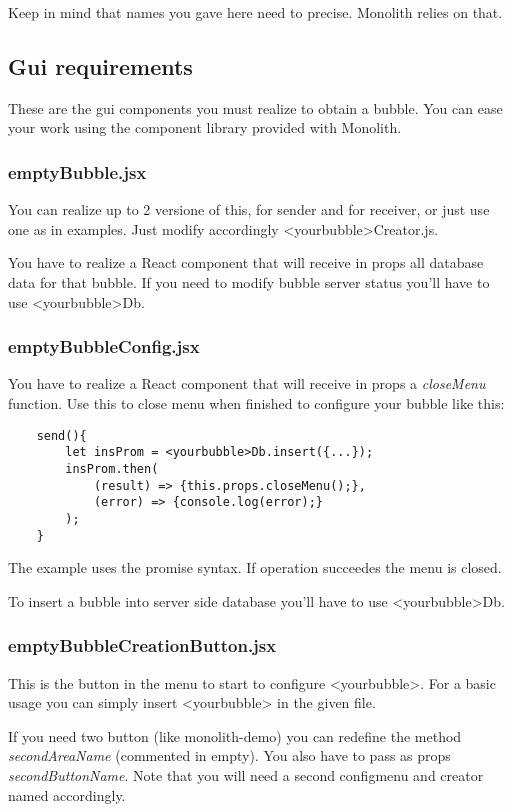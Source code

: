 Keep in mind that names you gave here need to precise. Monolith relies
on that.


\subsection{Gui requirements}
These are the gui components you must realize to obtain a bubble. You can ease your work using the component library provided with Monolith.
\subsubsection{emptyBubble.jsx}
You can realize up to 2 versione of this, for sender and for receiver,
or just use one as in examples. Just modify accordingly
<yourbubble>Creator.js.

You have to realize a React component that will receive in props all
database data for that bubble.
If you need to modify bubble server status you'll have to use
<yourbubble>Db.



\subsubsection{emptyBubbleConfig.jsx}
You have to realize a React component that will receive in props a
\emph{closeMenu} function. Use this to close menu when finished to
configure your bubble like this:

\begin{lstlisting}
    send(){
        let insProm = <yourbubble>Db.insert({...});
        insProm.then(
            (result) => {this.props.closeMenu();},
            (error) => {console.log(error);}
        );
    }
\end{lstlisting}

The example uses the promise syntax. If operation succeedes the menu
is closed.

To insert a bubble into server side database you'll have to use
<yourbubble>Db.

\subsubsection{emptyBubbleCreationButton.jsx}
This is the button in the menu to start to configure <yourbubble>.
For a basic usage you can simply insert <yourbubble> in the given
file.

If you need two button (like monolith-demo) you can redefine the
method \emph{secondAreaName} (commented in empty). You also have to
pass as props \emph{secondButtonName}.
Note that you will need a second configmenu and creator named accordingly.


